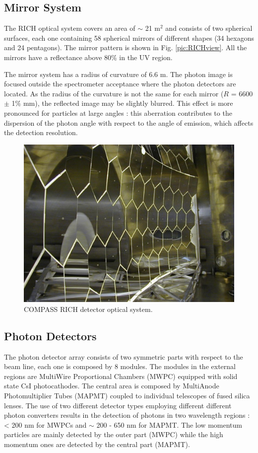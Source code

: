 \subsection{Mirror System}

The RICH optical system covers an area of $\sim$ 21 m$^2$ and consists of two spherical surfaces, each one containing 58 spherical mirrors of different shapes (34 hexagons and 24 pentagons). The mirror pattern is shown in Fig. \ref{pic:RICHview}. All the mirrors have a reflectance above 80\% in the UV region.

The mirror system has a radius of curvature of 6.6 m. The photon image is focused outside the spectrometer acceptance where the photon detectors are located. As the radius of the curvature is not the same for each mirror ($R$ = 6600 $\pm$ 1\% mm), the reflected image may be slightly blurred. This effect is more pronounced for particles at large angles : this aberration contributes to the dispersion of the photon angle with respect to the angle of emission, which affects the detection resolution.

\begin{figure}[!h]
  \centering
	\includegraphics[scale=0.4]{./gfx/RICHmirrors.png}
	\caption{COMPASS RICH detector optical system.}
	\label{pic:RICHmirrors}
\end{figure}

\subsection{Photon Detectors}

The photon detector array consists of two symmetric parts with respect to the beam line, each one is composed by 8 modules. The modules in the external regions are MultiWire Proportional Chambers (MWPC) equipped with solid state CsI photocathodes\cite{}. The central area is composed by MultiAnode Photomultiplier Tubes (MAPMT)\cite{} coupled to individual telescopes of fused silica lenses. The use of two different detector types employing different different photon converters results in the detection of photons in two wavelength regions : < 200 nm for MWPCs and $\sim$ 200 - 650 nm for MAPMT. The low momentum particles are mainly detected by the outer part (MWPC) while the high momentum ones are detected by the central part (MAPMT).

